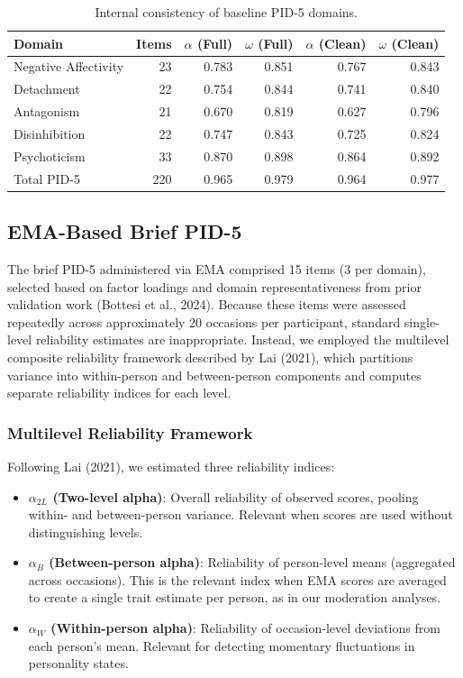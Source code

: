\documentclass[
  english,
  man,floatsintext]{apa6}
\begin{document}
\begin{table}

\caption{\label{tab:table-s1-pid5-reliability}Internal consistency of baseline PID-5 domains.}
\centering
\begin{tabular}[t]{lrrrrr}
\toprule
Domain & Items & $\alpha$ (Full) & $\omega$ (Full) & $\alpha$ (Clean) & $\omega$ (Clean)\\
\midrule
Negative Affectivity & 23 & 0.783 & 0.851 & 0.767 & 0.843\\
Detachment & 22 & 0.754 & 0.844 & 0.741 & 0.840\\
Antagonism & 21 & 0.670 & 0.819 & 0.627 & 0.796\\
Disinhibition & 22 & 0.747 & 0.843 & 0.725 & 0.824\\
Psychoticism & 33 & 0.870 & 0.898 & 0.864 & 0.892\\
\addlinespace
Total PID-5 & 220 & 0.965 & 0.979 & 0.964 & 0.977\\
\bottomrule
\end{tabular}
\end{table}

\subsection{EMA-Based Brief PID-5}\label{ema-based-brief-pid-5}

The brief PID-5 administered via EMA comprised 15 items (3 per domain), selected based on factor loadings and domain representativeness from prior validation work (Bottesi et al., 2024). Because these items were assessed repeatedly across approximately 20 occasions per participant, standard single-level reliability estimates are inappropriate. Instead, we employed the multilevel composite reliability framework described by Lai (2021), which partitions variance into within-person and between-person components and computes separate reliability indices for each level.

\subsubsection{Multilevel Reliability Framework}\label{multilevel-reliability-framework}

Following Lai (2021), we estimated three reliability indices:

\begin{itemize}
\item
  \textbf{\(\alpha_{2L}\) (Two-level alpha)}: Overall reliability of observed scores, pooling within- and between-person variance. Relevant when scores are used without distinguishing levels.
\item
  \textbf{\(\alpha_B\) (Between-person alpha)}: Reliability of person-level means (aggregated across occasions). This is the relevant index when EMA scores are averaged to create a single trait estimate per person, as in our moderation analyses.
\item
  \textbf{\(\alpha_W\) (Within-person alpha)}: Reliability of occasion-level deviations from each person's mean. Relevant for detecting momentary fluctuations in personality states.
\end{itemize}
\end{document}
